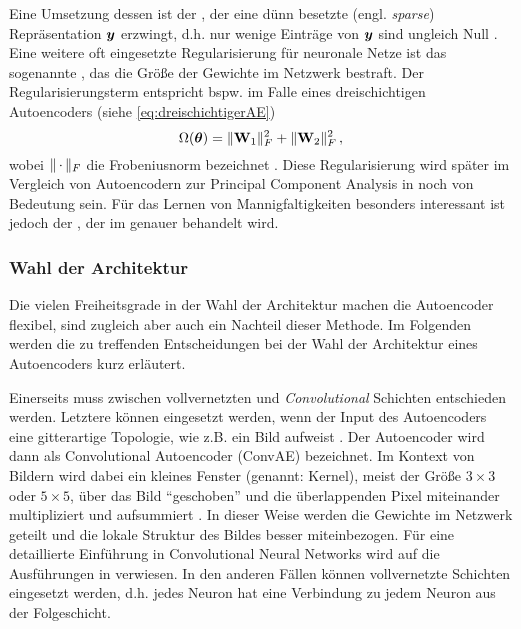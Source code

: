 Eine Umsetzung dessen ist der , der eine dünn besetzte (engl.
\textit{sparse}) Repräsentation $\bm{y}$ erzwingt, d.h. nur wenige Einträge von $\bm{y}$ sind
ungleich Null \parencite[505]{Goodfellow.2016}. Eine weitere oft eingesetzte Regularisierung für neuronale Netze ist
das sogenannte , das die Größe der Gewichte im Netzwerk bestraft. Der
Regularisierungsterm entspricht bspw. im Falle eines dreischichtigen Autoencoders (siehe
\eqref{eq:dreischichtigerAE})
\begin{equation}
	\label{eq:WeightDecay}
	\Omega(\bm{\theta}) = \lVert\mathbf{W}_1\rVert^2_F + \lVert\mathbf{W}_2\rVert^2_F \, ,
\end{equation}
wobei $\lVert\,\cdot\,\rVert_F$ die Frobeniusnorm bezeichnet \parencite[1]{Kunin.2019}. Diese Regularisierung wird später im Vergleich von Autoencodern zur
Principal Component Analysis in  noch von Bedeutung sein.
Für das Lernen von Mannigfaltigkeiten besonders interessant ist jedoch der  \parencite{Rifai.2011a}, der im  genauer behandelt wird.

\subsubsection{Wahl der Architektur}
\label{ch:MethodenDerDimRed:ML:AE:WahlArchitektur}

Die vielen Freiheitsgrade in der Wahl der Architektur machen die Autoencoder flexibel, sind
zugleich aber auch ein Nachteil dieser Methode. Im Folgenden werden die zu treffenden
Entscheidungen bei der Wahl der Architektur eines Autoencoders kurz erläutert.

Einerseits muss zwischen vollvernetzten und \textit{Convolutional} Schichten entschieden werden.
Letztere können eingesetzt werden, wenn der Input des Autoencoders eine gitterartige Topologie, wie
z.B. ein Bild aufweist \parencite[330]{Goodfellow.2016}. Der Autoencoder wird dann als Convolutional Autoencoder (ConvAE)
bezeichnet. Im Kontext von Bildern wird dabei ein kleines Fenster (genannt: Kernel), meist der
Größe $3 \times 3$ oder $5 \times 5$, über das Bild \enquote{geschoben} und die überlappenden Pixel
miteinander multipliziert und aufsummiert \parencite[333]{Goodfellow.2016}. In dieser Weise werden die Gewichte im Netzwerk geteilt und die
lokale Struktur des Bildes besser miteinbezogen. Für eine detaillierte Einführung in Convolutional
Neural Networks wird auf die Ausführungen in \textcite[330 -- 372]{Goodfellow.2016} verwiesen. In
den anderen Fällen können vollvernetzte Schichten eingesetzt werden, d.h. jedes Neuron hat eine
Verbindung zu jedem Neuron aus der Folgeschicht.

